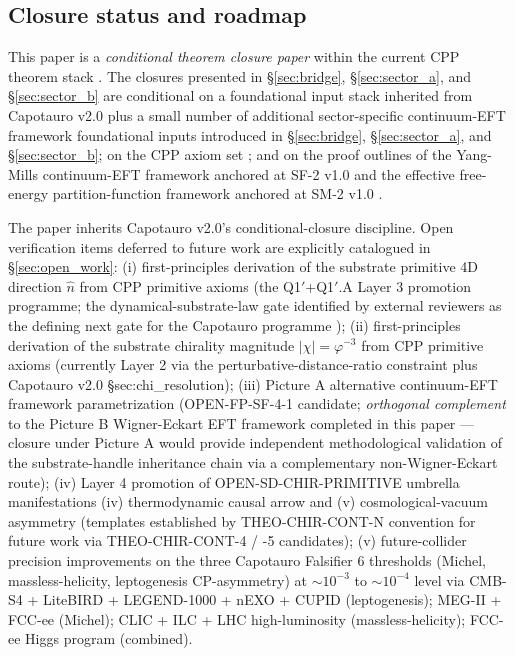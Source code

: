 \documentclass[11pt,letterpaper]{article}
\begin{document}
\subsection{Closure status and roadmap}
\label{sec:closure_status}

This paper is a \emph{conditional theorem closure paper} within the current CPP theorem stack \cite{ConditionalClosure}. The closures presented in §\ref{sec:bridge}, §\ref{sec:sector_a}, and §\ref{sec:sector_b} are conditional on a foundational input stack inherited from Capotauro v2.0 \cite{Capotauro} plus a small number of additional sector-specific continuum-EFT framework foundational inputs introduced in §\ref{sec:bridge}, §\ref{sec:sector_a}, and §\ref{sec:sector_b}; on the CPP axiom set \cite{AxiomDocument}; and on the proof outlines of the Yang-Mills continuum-EFT framework anchored at SF-2 v1.0 \cite{SF2v1, EW5} and the effective free-energy partition-function framework anchored at SM-2 v1.0 \cite{SM2v1}.

The paper inherits Capotauro v2.0's conditional-closure discipline. Open verification items deferred to future work are explicitly catalogued in §\ref{sec:open_work}: (i) first-principles derivation of the substrate primitive 4D direction $\hat{n}$ from CPP primitive axioms (the Q1$'$+Q1$'$.A Layer 3 promotion programme; the dynamical-substrate-law gate identified by external reviewers as the defining next gate for the Capotauro programme \cite{ReviewerNotes}); (ii) first-principles derivation of the substrate chirality magnitude $|\chi| = \varphi^{-3}$ from CPP primitive axioms (currently Layer 2 via the perturbative-distance-ratio constraint plus Capotauro v2.0 §sec:chi\_resolution); (iii) Picture A alternative continuum-EFT framework parametrization (OPEN-FP-SF-4-1 candidate; \emph{orthogonal complement} to the Picture B Wigner-Eckart EFT framework completed in this paper — closure under Picture A would provide independent methodological validation of the substrate-handle inheritance chain via a complementary non-Wigner-Eckart route); (iv) Layer 4 promotion of OPEN-SD-CHIR-PRIMITIVE umbrella manifestations (iv) thermodynamic causal arrow and (v) cosmological-vacuum asymmetry (templates established by THEO-CHIR-CONT-N convention for future work via THEO-CHIR-CONT-4 / -5 candidates); (v) future-collider precision improvements on the three Capotauro Falsifier 6 thresholds (Michel, massless-helicity, leptogenesis CP-asymmetry) at $\sim 10^{-3}$ to $\sim 10^{-4}$ level via CMB-S4 + LiteBIRD + LEGEND-1000 + nEXO + CUPID (leptogenesis); MEG-II + FCC-ee (Michel); CLIC + ILC + LHC high-luminosity (massless-helicity); FCC-ee Higgs program (combined).
\end{document}
